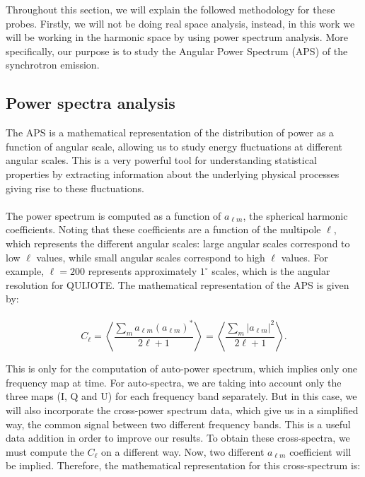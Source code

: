 
Throughout this section, we will explain the followed methodology for these probes. Firstly, we will not be doing real space analysis, instead, in this work we will be working in the harmonic space by using power spectrum analysis. More specifically, our purpose is to study the Angular Power Spectrum (APS) of the synchrotron emission.

\subsection{Power spectra analysis}
\label{sec:power_spectrum}

The APS is a mathematical representation of the distribution of power as a function of angular scale, allowing us to study energy fluctuations 
at different angular scales. This is a very powerful tool for understanding statistical properties by extracting information about the underlying 
physical processes giving rise to these fluctuations.
\paragraph*{}

The power spectrum is computed as a function of $a_{\ell m}$, the spherical harmonic coefficients. Noting that these coefficients are a function of the multipole $\ell$, which represents the different angular scales: large angular scales correspond to low $\ell$ values, while small angular scales correspond to high $\ell$ values. For example, $\ell = 200$ represents approximately $1^{\circ}$ scales, which is the angular resolution for QUIJOTE. The mathematical representation of the APS is given by:
\paragraph*{}


\begin{equation}
    \label{eq:cl_auto}
    C_{\ell} = \left < \frac{\sum_{m}^{} a_{\ell m} (a_{\ell m})^{*} }{2\ell +1} \right > = \left < \frac{\sum_{m}^{} |a_{\ell m}|^2}{2\ell +1} \right >.
\end{equation}

This is only for the computation of auto-power spectrum, which implies only one frequency map at time. For auto-spectra, we are taking into account 
only the three maps (I, Q and U) for each frequency band separately. But in this case, we will also incorporate the cross-power spectrum data, which give us in a simplified way, the common signal between two different frequency bands. This is a useful data addition in order to improve our results. To obtain 
these cross-spectra, we must compute the $C_{\ell}$ on a different way. Now, two different $a_{\ell m}$ coefficient will be implied. Therefore, the mathematical 
representation for this cross-spectrum is:


